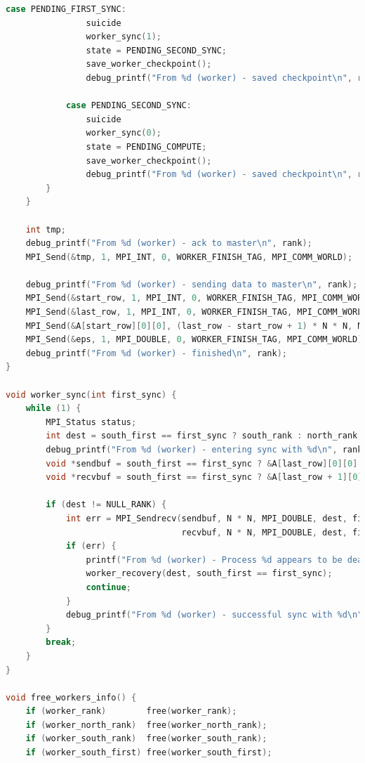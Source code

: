 \documentclass[a4paper]{article}
\begin{document}
\begin{lstlisting}[caption=jac\_3d\_mpi\_ft.c, label={lst:2}, language=C]
            case PENDING_FIRST_SYNC:
                suicide
                worker_sync(1);
                state = PENDING_SECOND_SYNC;
                save_worker_checkpoint();
                debug_printf("From %d (worker) - saved checkpoint\n", rank);

            case PENDING_SECOND_SYNC:
                suicide
                worker_sync(0);
                state = PENDING_COMPUTE;
                save_worker_checkpoint();
                debug_printf("From %d (worker) - saved checkpoint\n", rank);
        }
    }

    int tmp;
    debug_printf("From %d (worker) - ack to master\n", rank);
    MPI_Send(&tmp, 1, MPI_INT, 0, WORKER_FINISH_TAG, MPI_COMM_WORLD);

    debug_printf("From %d (worker) - sending data to master\n", rank);
    MPI_Send(&start_row, 1, MPI_INT, 0, WORKER_FINISH_TAG, MPI_COMM_WORLD);
    MPI_Send(&last_row, 1, MPI_INT, 0, WORKER_FINISH_TAG, MPI_COMM_WORLD);
    MPI_Send(&A[start_row][0][0], (last_row - start_row + 1) * N * N, MPI_DOUBLE, 0, WORKER_FINISH_TAG, MPI_COMM_WORLD);
    MPI_Send(&eps, 1, MPI_DOUBLE, 0, WORKER_FINISH_TAG, MPI_COMM_WORLD);
    debug_printf("From %d (worker) - finished\n", rank);
}

void worker_sync(int first_sync) {
    while (1) {
        MPI_Status status;
        int dest = south_first == first_sync ? south_rank : north_rank;
        debug_printf("From %d (worker) - entering sync with %d\n", rank, dest);
        void *sendbuf = south_first == first_sync ? &A[last_row][0][0] : &A[start_row][0][0];
        void *recvbuf = south_first == first_sync ? &A[last_row + 1][0][0] : &A[start_row - 1][0][0];

        if (dest != NULL_RANK) {
            int err = MPI_Sendrecv(sendbuf, N * N, MPI_DOUBLE, dest, first_sync ? FIRST_SYNC_TAG : SECOND_SYNC_TAG,
                                   recvbuf, N * N, MPI_DOUBLE, dest, first_sync ? FIRST_SYNC_TAG : SECOND_SYNC_TAG, MPI_COMM_WORLD, &status);
            if (err) {
                printf("From %d (worker) - Process %d appears to be dead\n", rank, dest);
                worker_recovery(dest, south_first == first_sync);
                continue;
            }
            debug_printf("From %d (worker) - successful sync with %d\n", rank, dest);
        } 
        break;
    } 
}

void free_workers_info() {
    if (worker_rank)        free(worker_rank);
    if (worker_north_rank)  free(worker_north_rank);
    if (worker_south_rank)  free(worker_south_rank);
    if (worker_south_first) free(worker_south_first);


\end{lstlisting}
\end{document}
